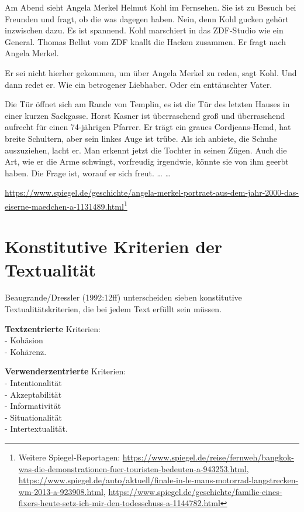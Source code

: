 \documentclass[
  letterpaper,
  DIV=11,
  numbers=noendperiod]{scrreprt}
\begin{document}
Am Abend sieht Angela Merkel Helmut Kohl im Fernsehen. Sie ist zu Besuch
bei Freunden und fragt, ob die was dagegen haben. Nein, denn Kohl gucken
gehört inzwischen dazu. Es ist spannend. Kohl marschiert in das
ZDF-Studio wie ein General. Thomas Bellut vom ZDF knallt die Hacken
zusammen. Er fragt nach Angela Merkel.

Er sei nicht hierher gekommen, um über Angela Merkel zu reden, sagt
Kohl. Und dann redet er. Wie ein betrogener Liebhaber. Oder ein
enttäuschter Vater.

Die Tür öffnet sich am Rande von Templin, es ist die Tür des letzten
Hauses in einer kurzen Sackgasse. Horst Kasner ist überraschend groß und
überraschend aufrecht für einen 74-jährigen Pfarrer. Er trägt ein graues
Cordjeans-Hemd, hat breite Schultern, aber sein linkes Auge ist trübe.
Als ich anbiete, die Schuhe auszuziehen, lacht er. Man erkennt jetzt die
Tochter in seinen Zügen. Auch die Art, wie er die Arme schwingt,
vorfreudig irgendwie, könnte sie von ihm geerbt haben. Die Frage ist,
worauf er sich freut. \ldots{} \ldots{}

\url{https://www.spiegel.de/geschichte/angela-merkel-portraet-aus-dem-jahr-2000-das-eiserne-maedchen-a-1131489.html}\footnote{Weitere
  Spiegel-Reportagen:
  \url{https://www.spiegel.de/reise/fernweh/bangkok-was-die-demonstrationen-fuer-touristen-bedeuten-a-943253.html},
  \url{https://www.spiegel.de/auto/aktuell/finale-in-le-mans-motorrad-langstrecken-wm-2013-a-923908.html},
  \url{https://www.spiegel.de/geschichte/familie-eines-fixers-heute-setz-ich-mir-den-todesschuss-a-1144782.html}}

\hypertarget{konstitutive-kriterien-der-textualituxe4t}{%
\section{Konstitutive Kriterien der
Textualität}\label{konstitutive-kriterien-der-textualituxe4t}}

Beaugrande/Dressler (1992:12ff) unterscheiden sieben konstitutive
Textualitätskriterien, die bei jedem Text erfüllt sein müssen.

\textbf{Textzentrierte} Kriterien:\\
- Kohäsion\\
- Kohärenz.

\textbf{Verwenderzentrierte} Kriterien:\\
- Intentionalität\\
- Akzeptabilität\\
- Informativität\\
- Situationalität\\
- Intertextualität.
\end{document}
